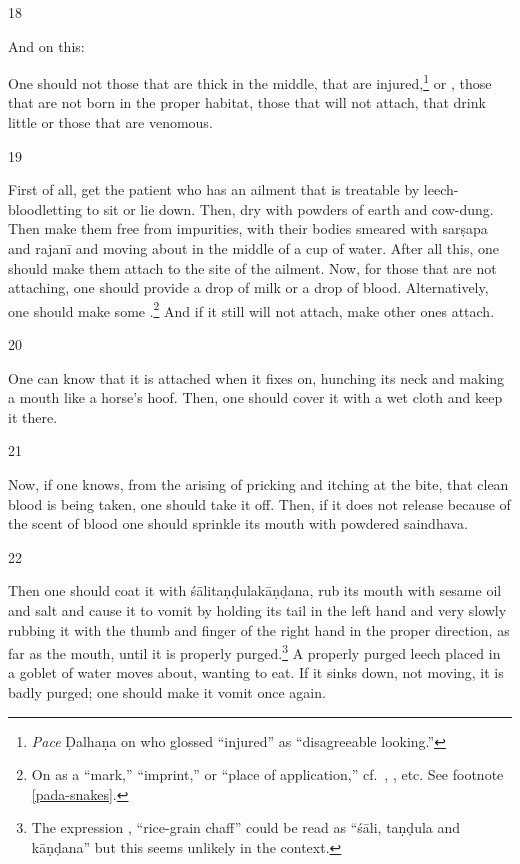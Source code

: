 \begin{translation}
\item[18]

And on this:

\begin{sloka}
    One should not  those that are thick in the middle, that are
injured,\footnote{\emph{Pace} Ḍalhaṇa on  who glossed
     “injured” as  “disagreeable
    looking.”} or , those that are not born in the proper habitat,
    those that will not attach, that drink little or those that are venomous.
\end{sloka}

\item[19] 

First of all, get the patient who has an ailment that is treatable by
leech-bloodletting to sit or lie down.  Then, dry 
with powders of earth and cow-dung.  Then make them free from impurities, 
with
their bodies smeared with \gls{sarṣapa} and \gls{rajanī} and moving about in 
the
middle of a cup of water. After all this, one should make them attach to the
site of the ailment.  Now, for those that are not attaching, one should provide
a drop of milk or a drop of blood. Alternatively, one should make some
.\footnote{\label{pada-leeches}On 
    as a “mark,” “imprint,” or “place of application,” cf.\ ,
    , etc.  See footnote \ref{pada-snakes}.} And if it still will
    not attach, make other ones attach.

\item [20]
 
One can know that it is attached when it fixes on, hunching its neck and
making a mouth like a horse's hoof. Then, one should cover it with a wet
cloth and keep it there.
 
 \item[21]
 
Now, if one knows, from the arising of pricking and itching at the
bite, that clean blood is being taken, one should take it off.  Then,
if it does not release because of the scent of blood one should sprinkle its
mouth with powdered \gls{saindhava}.
    
\item[22]

Then one should coat it with \gls{śālitaṇḍulakāṇḍana}, rub its mouth with
sesame oil and salt and cause it to vomit by holding its tail in the left
hand and very slowly rubbing it with the thumb and finger of the right hand
in the proper direction, as far as the mouth, until it is properly purged.\footnote{The 
expression , “rice-grain chaff” could be read as “\gls{śāli}, 
\gls{taṇḍula} and \gls{kāṇḍana}” but this seems unlikely in the context.} 
A properly purged leech placed in a goblet of water moves about, wanting to
eat.  If it sinks down, not moving, it is badly purged; one should make it vomit
once again.  


\end{translation}
